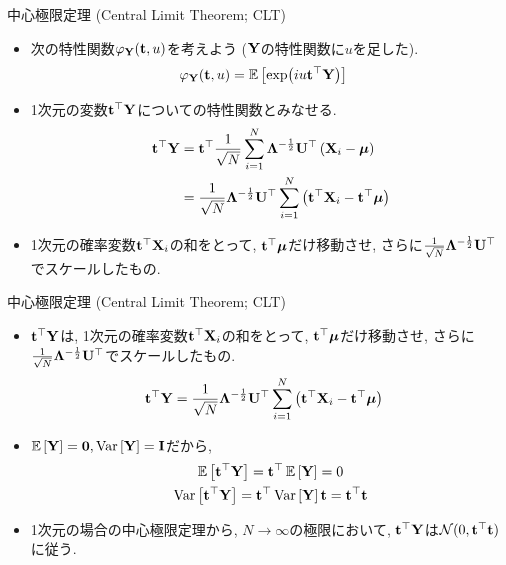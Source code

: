 \documentclass[dvipdfmx,notheorems,t]{beamer}
\begin{document}
\begin{frame}{中心極限定理 (Central Limit Theorem; CLT)}
\begin{itemize}
  \item 次の特性関数$\varphi_{\vb{Y}}(\vb{t}, u)$を考えよう ($\vb{Y}$の特性関数に$u$を足した).
  \begin{align*}
    \varphi_{\vb{Y}}(\vb{t}, u) &= \operatorname{\mathbb{E}} \left[ \exp(iu \vb{t}^\top \vb{Y}) \right]
  \end{align*}
  \item 1次元の変数$\vb{t}^\top \vb{Y}$についての特性関数とみなせる.
  \begin{align*}
    \vb{t}^\top \vb{Y} &= \vb{t}^\top \frac{1}{\sqrt{N}} \sum_{i = 1}^N
      \vb{\Lambda}^{-\frac{1}{2}} \vb{U}^\top \left( \vb{X}_i - \vb*{\mu} \right) \\
      &= \frac{1}{\sqrt{N}} \vb{\Lambda}^{-\frac{1}{2}} \vb{U}^\top
        \sum_{i = 1}^N \left( \vb{t}^\top \vb{X}_i - \vb{t}^\top \vb*{\mu} \right)
  \end{align*}
  \item 1次元の確率変数$\vb{t}^\top \vb{X}_i$の和をとって, $\vb{t}^\top \vb*{\mu}$だけ移動させ,
  さらに$\frac{1}{\sqrt{N}} \vb{\Lambda}^{-\frac{1}{2}} \vb{U}^\top$でスケールしたもの.
\end{itemize}
\end{frame}

\begin{frame}{中心極限定理 (Central Limit Theorem; CLT)}
\begin{itemize}
  \item $\vb{t}^\top \vb{Y}$は, 1次元の確率変数$\vb{t}^\top \vb{X}_i$の和をとって,
  $\vb{t}^\top \vb*{\mu}$だけ移動させ,
  さらに$\frac{1}{\sqrt{N}} \vb{\Lambda}^{-\frac{1}{2}} \vb{U}^\top$でスケールしたもの.
  \begin{align*}
    \vb{t}^\top \vb{Y} &= \frac{1}{\sqrt{N}} \vb{\Lambda}^{-\frac{1}{2}} \vb{U}^\top
      \sum_{i = 1}^N \left( \vb{t}^\top \vb{X}_i - \vb{t}^\top \vb*{\mu} \right)
  \end{align*}
  \item $\operatorname{\mathbb{E}} \left[ \vb{Y} \right] = \vb{0}, \operatorname{Var} \left[ \vb{Y} \right] = \vb{I}$だから,
  \begin{gather*}
    \operatorname{\mathbb{E}} \left[ \vb{t}^\top \vb{Y} \right] = \vb{t}^\top \operatorname{\mathbb{E}} \left[ \vb{Y} \right] = 0 \\
    \operatorname{Var} \left[ \vb{t}^\top \vb{Y} \right] = \vb{t}^\top \operatorname{Var} \left[ \vb{Y} \right] \vb{t} = \vb{t}^\top \vb{t}
  \end{gather*}
  \item 1次元の場合の中心極限定理から, $N \to \infty$の極限において,
  $\vb{t}^\top \vb{Y}$は$\mathcal{N}(0, \vb{t}^\top \vb{t})$に従う.
\end{itemize}
\end{frame}
\end{document}
